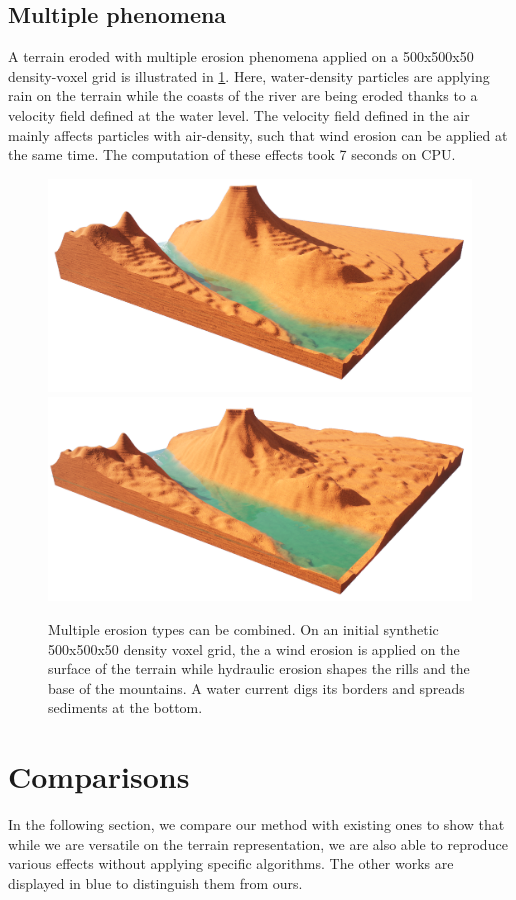 \subsection{Multiple phenomena} 
A terrain eroded with multiple erosion phenomena applied on a 500x500x50 density-voxel grid is illustrated in \cref{fig:erosion_multiErosions}. Here, water-density particles are applying rain on the terrain while the coasts of the river are being eroded thanks to a velocity field defined at the water level. The velocity field defined in the air mainly affects particles with air-density, such that wind erosion can be applied at the same time. The computation of these effects took 7 seconds on CPU.

\begin{figure}[ht]
    \includegraphics[width=0.49\linewidth]{MultiEffects_base.png}
    \includegraphics[width=0.49\linewidth]{MultiEffects.png}
    \caption{Multiple erosion types can be combined. On an initial synthetic 500x500x50 density voxel grid, the a wind erosion is applied on the surface of the terrain while hydraulic erosion shapes the rills and the base of the mountains. A water current digs its borders and spreads sediments at the bottom. }
    \label{fig:erosion_multiErosions}
\end{figure}

\section{Comparisons}
In the following section, we compare our method with existing ones to show that while we are versatile on the terrain representation, we are also able to reproduce various effects without applying specific algorithms. The other works are displayed in blue to distinguish them from ours.

